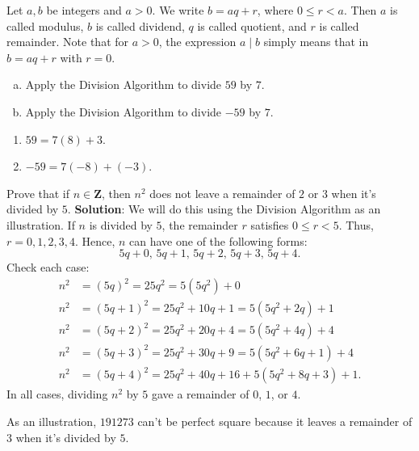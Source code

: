 \begin{Definition}{}{}
    Let $ a,b $ be integers and $ a>0 $. We write $ b=aq+r $, where $ 0\le r<a $. Then $ a $ is called modulus, $ b $ is
    called dividend, $ q $ is called quotient, and $ r $ is called remainder.
    \tcblower{}
    Note that for $ a>0 $, the expression $ a\mid b $ simply means that in $ b=aq+r $ with $ r=0 $.
\end{Definition}
\begin{Example}{}{}
    \begin{enumerate}[(a)]
        \item Apply the Division Algorithm to divide $59$ by $7$.
        \item Apply the Division Algorithm to divide $-59$ by $7$.
    \end{enumerate}
    \tcblower{}
    \begin{enumerate}
        \item $ 59=7(8)+3 $.
        \item $ -59=7(-8)+(-3) $.
    \end{enumerate}
\end{Example}
\begin{Example}{}{}
    Prove that if $ n\in\mathbf{Z} $, then $ n^2 $ does not leave a remainder of $ 2 $
    or $ 3 $ when it's divided by $ 5 $.
    \tcblower{}
    \textbf{Solution}: We will do this using the Division Algorithm as an illustration. If $ n $ is divided by $ 5 $,
    the remainder $ r $ satisfies $ 0\le r<5 $. Thus, $ r=0,1,2,3,4 $. Hence, $ n $ can have one of the following forms:
    \[ 5q+0,\, 5q+1,\, 5q+2,\, 5q+3,\, 5q+4. \]
    Check each case:
    \begin{align*}
        n^2 & =(5q)^2=25q^2=5(5q^2)+0                \\
        n^2 & =(5q+1)^2=25q^2+10q+1=5(5q^2+2q)+1     \\
        n^2 & =(5q+2)^2=25q^2+20q+4=5(5q^2+4q)+4     \\
        n^2 & =(5q+3)^2=25q^2+30q+9=5(5q^2+6q+1)+4   \\
        n^2 & =(5q+4)^2=25q^2+40q+16+5(5q^2+8q+3)+1.
    \end{align*}
    In all cases, dividing $ n^2 $ by $ 5 $ gave a remainder of $ 0 $, $ 1 $, or $ 4 $.
\end{Example}
As an illustration, $191273$ can't be perfect square because it leaves a remainder
of $3$ when it's divided by $5$.
